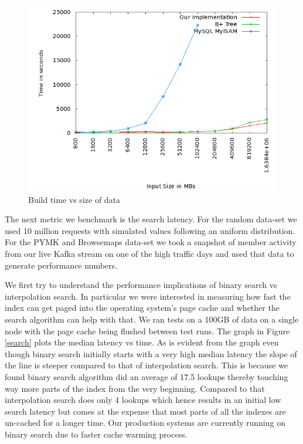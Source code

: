 \documentclass[twocolumn]{article}
\begin{document}
\begin{figure}
  \centering
    \includegraphics[scale=0.35]{images/build.png}
  \caption{Build time vs size of data}
  \label{build}
\end{figure}

The next metric we benchmark is the search latency. For the random data-set we used 10 million requests with simulated values following an uniform distribution. For the PYMK and Browsemaps data-set we took a snapshot of member activity from our live Kafka stream on one of the high traffic days and used that data to generate performance numbers.

We first try to understand the performance implications of binary search vs interpolation search. In particular we were interested in measuring how fast the index can get paged into the operating system's page cache and whether the search algorithm can help with that. We ran tests on a 100GB of data on a single node with the page cache being flushed between test runs. The graph in Figure \ref{search} plots the median latency vs time. As is evident from the graph even though binary search initially starts with a very high median latency the slope of the line is steeper compared to that of interpolation search. This is because we found binary search algorithm did an average of 17.5 lookups thereby touching way more parts of the index from the very beginning. Compared to that interpolation search does only 4 lookups which hence results in an initial low search latency but comes at the expense that most parts of all the indexes are un-cached for a longer time. Our production systems are currently running on binary search due to faster cache warming process.  
\end{document}

